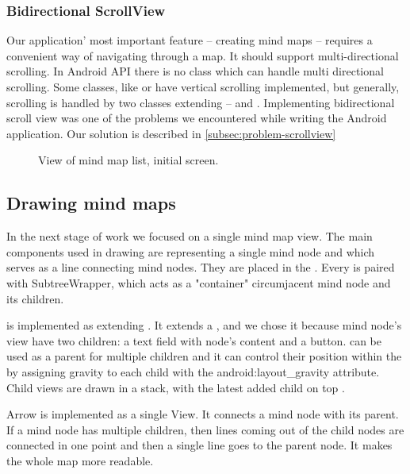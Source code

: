 \subsubsection{Bidirectional ScrollView}
\label{subsubsec:action-bar}
Our application' most important feature -- creating mind maps -- requires a convenient way of navigating through a map. It should support multi-directional scrolling. In Android API there is no class which can handle multi directional scrolling. Some classes, like  or  have vertical scrolling implemented, but generally, scrolling is handled by two classes extending  --  and . Implementing bidirectional scroll view was one of the problems we encountered while writing the Android application. Our solution is described in \cref{subsec:problem-scrollview}


\begin{figure}[h]
	\centering
	\caption{View of mind map list, initial screen.}
	\label{fig:screen-maplist}
\end{figure}

\subsection{Drawing mind maps}
\label{subsec:drawing}
In the next stage of work we focused on a single mind map view. The main components used in drawing are  representing a single mind node and  which serves as a line connecting mind nodes. They are placed in the . Every   is paired with SubtreeWrapper, which acts as a "container" circumjacent mind node and its children.

 is implemented as extending . It extends a , and we chose it because mind node's view have two children: a text field with node's content and a button.  can be used as a parent for multiple children and it can control their position within the  by assigning gravity to each child with the android:layout\_gravity attribute. Child views are drawn in a stack, with the latest added child on top \cite{API:2013:fl}.

Arrow is implemented as a single View. It connects a mind node with its parent. If a mind node has multiple children, then lines coming out of the child nodes are connected in one point and then a single line goes to the parent node. It makes the whole map more readable. 

